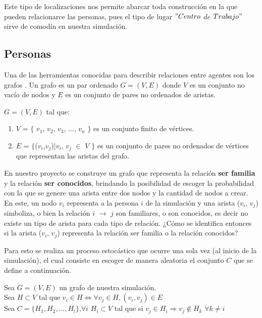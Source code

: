 Este tipo de localizaciones nos permite abarcar toda construcción en la que pueden relacionarce las personas, pues
el tipo de lugar $"Centro$ $de$ $Trabajo"$ sirve de comodín en nuestra simulación.

\subsection{Personas}
Una de las herramientas conocidas para describir relaciones entre agentes son los grafos \autocite{Newman2003}. Un grafo
es un par ordenado $G = (V,E)$ donde $V$ es un conjunto no vacío de nodos y $E$ es un conjunto de pares 
no ordenados de aristas.

\begin{center}
    $G=(V,E)$ tal que:\\
    \begin{enumerate}
        \item $V$ = $\lbrace$ $v_{1}$, $v_{2}$, $v_{3}$, ..., $v_{n}$ $\rbrace$ es un conjunto finito de vértices.
        \item $E$ = $\lbrace$($v_{i}$,$v_{j}$)|$v_{i}$, $v_{j}$ $\in$ $V$ $\rbrace$  es un conjunto de pares no ordenados de vértices que representan las aristas del grafo.
    \end{enumerate}
\end{center}

En nuestro proyecto se construye un grafo que representa la relación \textbf{ser familia} y la relación \textbf{ser conocidos}, brindando
la posibilidad de escoger la probabilidad con la que se genere una arista entre dos nodos y la cantidad de nodos a crear. 
En este, un nodo $v_{i}$ representa a la persona $i$ de la simulación y una arista ($v_{i}$, $v_{j}$) simboliza,
o bien la relación $i$ $\rightarrow$ $j$ son familiares, o son conocidos, es decir no existe un tipo de arista para cada
tipo de relación. ¿Cómo se identifica entonces si la arista ($v_{i}$, $v_{j}$) representa la relación 
ser familia o la relación conocidos?

Para esto se realiza un proceso estocástico que ocurre una sola vez (al inicio de la simulación), el cual consiste 
en escoger de manera aleatoria el conjunto $C$ que se define a continuación.
\begin{center}
    Sea $G = (V,E)$ un grafo de nuestra simulación.\\
    Sea $H \subset V$ tal que $v_{i} \in H \Leftrightarrow \forall v_{j} \in H, (v_{i},v_{j}) \in E$\\
    Sea $C = \lbrace H_{1}, H_{2}, ..., H_{l} \rbrace$,$\forall i$ $H_{i} \subset V$ tal que si $v_{j} \in H_{i} \Rightarrow v_{j} \notin H_{k}$ $\forall k \neq i$\\
\end{center}

